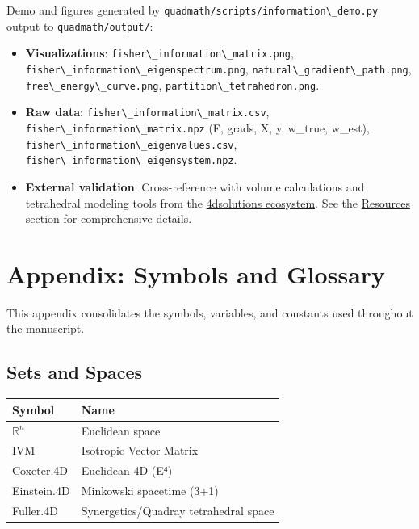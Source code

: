 \documentclass[
  10pt,
]{article}
\newcommand{\passthrough}[1]{#1}
\providecommand{\tightlist}{%
  \setlength{\itemsep}{0pt}\setlength{\parskip}{0pt}}
\begin{document}
Demo and figures generated by
\passthrough{\lstinline!quadmath/scripts/information\_demo.py!} output
to \passthrough{\lstinline!quadmath/output/!}:

\begin{itemize}
\tightlist
\item
  \textbf{Visualizations}:
  \passthrough{\lstinline!fisher\_information\_matrix.png!},
  \passthrough{\lstinline!fisher\_information\_eigenspectrum.png!},
  \passthrough{\lstinline!natural\_gradient\_path.png!},
  \passthrough{\lstinline!free\_energy\_curve.png!},
  \passthrough{\lstinline!partition\_tetrahedron.png!}.
\item
  \textbf{Raw data}:
  \passthrough{\lstinline!fisher\_information\_matrix.csv!},
  \passthrough{\lstinline!fisher\_information\_matrix.npz!} (F, grads,
  X, y, w\_true, w\_est),
  \passthrough{\lstinline!fisher\_information\_eigenvalues.csv!},
  \passthrough{\lstinline!fisher\_information\_eigensystem.npz!}.
\item
  \textbf{External validation}: Cross-reference with volume calculations
  and tetrahedral modeling tools from the
  \href{https://github.com/4dsolutions}{4dsolutions ecosystem}. See the
  \href{07_resources.md}{Resources} section for comprehensive details. 
\end{itemize}

\hypertarget{appendix-symbols-and-glossary}{%
\section{Appendix: Symbols and
Glossary}\label{appendix-symbols-and-glossary}}

This appendix consolidates the symbols, variables, and constants used
throughout the manuscript.

\hypertarget{sets-and-spaces}{%
\subsection{Sets and Spaces}\label{sets-and-spaces}}

\begin{longtable}[]{@{}ll@{}}
\toprule
Symbol & Name\tabularnewline
\midrule
\endhead
\(\mathbb{R}^n\) & Euclidean space\tabularnewline
IVM & Isotropic Vector Matrix\tabularnewline
Coxeter.4D & Euclidean 4D (E⁴)\tabularnewline
Einstein.4D & Minkowski spacetime (3+1)\tabularnewline
Fuller.4D & Synergetics/Quadray tetrahedral space\tabularnewline
\bottomrule
\end{longtable}
\end{document}
